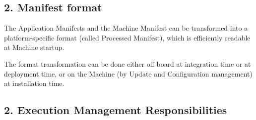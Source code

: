 \subsection*{2. {\bfseries Manifest format}}


\begin{DoxyItemize}
\item The Application Manifests and the Machine Manifest can be transformed into a platform-\/specific format (called Processed Manifest), which is efficiently readable at Machine startup.
\item The format transformation can be done either off board at integration time or at deployment time, or on the Machine (by Update and Configuration management) at installation time.
\end{DoxyItemize}

\subsection*{2. {\bfseries Execution Management Responsibilities}}


